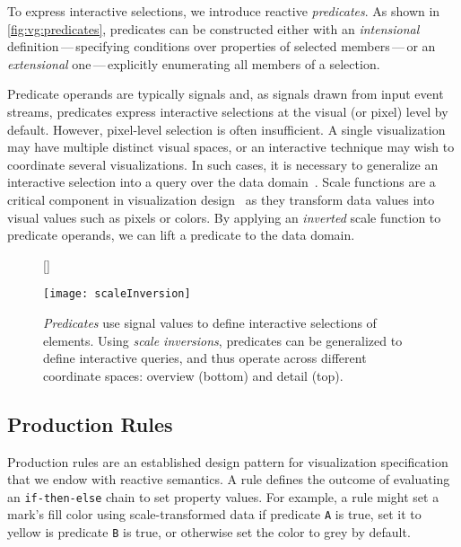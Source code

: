 To express interactive selections, we introduce reactive \emph{predicates}. As
shown in \cref{fig:vg:predicates}, predicates can be constructed either with an
\emph{intensional} definition\,---\,specifying conditions over properties of
selected members\,---\,or an \emph{extensional} one\,---\,explicitly enumerating
all members of a selection.

Predicate operands are typically signals and, as signals drawn from input event
streams, predicates express interactive selections at the visual (or pixel)
level by default. However, pixel-level selection is often insufficient. A single
visualization may have multiple distinct visual spaces, or an interactive
technique may wish to coordinate several visualizations. In such cases, it is
necessary to generalize an interactive selection into a query over the data
domain~\cite{heer:generalized}. Scale functions are a critical component in
visualization design~ \cite{wilkinson:grammar} as they transform data values
into visual values such as pixels or colors. By applying an \emph{inverted}
scale function to predicate operands, we can lift a predicate to the data
domain.

\begin{figure}[b!]
  [\FBwidth]
  {\caption{\emph{Predicates} use signal values to define interactive selections
of elements. Using \emph{scale inversions}, predicates can be generalized to
define interactive queries, and thus operate across different coordinate spaces:
overview (bottom) and detail (top).}
  \label{fig:vl:scaleInversion}}
  {\texttt{[image: scaleInversion]}}
\end{figure}

\subsection{Production Rules}

\vspace{-7pt}

Production rules are an established design pattern for visualization
specification~\cite{heer:designpatterns} that we endow with reactive semantics.
A rule defines the outcome of evaluating an \texttt{if-then-else} chain to set
property values. For example, a rule might set a mark's fill color using
scale-transformed data if predicate \texttt{A} is true, set it to yellow is
predicate \texttt{B} is true, or otherwise set the color to grey by default.

